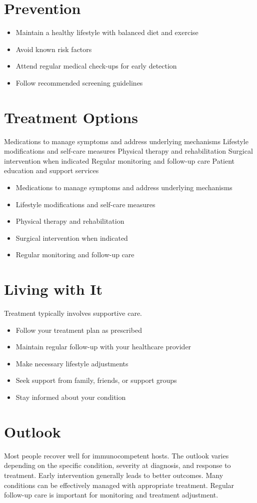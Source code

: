 \section{Prevention}
\begin{itemize}[noitemsep]
  \item Maintain a healthy lifestyle with balanced diet and exercise
  \item Avoid known risk factors
  \item Attend regular medical check-ups for early detection
  \item Follow recommended screening guidelines
\end{itemize}
\section{Treatment Options}
Medications to manage symptoms and address underlying mechanisms Lifestyle modifications and self-care measures Physical therapy and rehabilitation Surgical intervention when indicated Regular monitoring and follow-up care Patient education and support services

\begin{itemize}[noitemsep]
  \item Medications to manage symptoms and address underlying mechanisms
  \item Lifestyle modifications and self-care measures
  \item Physical therapy and rehabilitation
  \item Surgical intervention when indicated
  \item Regular monitoring and follow-up care
\end{itemize}
\section{Living with It}
Treatment typically involves supportive care.

\begin{itemize}[noitemsep]
  \item Follow your treatment plan as prescribed
  \item Maintain regular follow-up with your healthcare provider
  \item Make necessary lifestyle adjustments
  \item Seek support from family, friends, or support groups
  \item Stay informed about your condition
\end{itemize}
\section{Outlook}
Most people recover well for immunocompetent hosts. The outlook varies depending on the specific condition, severity at diagnosis, and response to treatment. Early intervention generally leads to better outcomes. Many conditions can be effectively managed with appropriate treatment. Regular follow-up care is important for monitoring and treatment adjustment.
